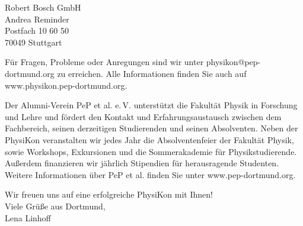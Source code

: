 \documentclass[
  pepbrief,
  fontsize=12pt,
  paper=a4,
  DIV=14,
  parskip=half,
  backaddress=false,
]{scrlttr2}
\begin{document}
\begin{letter}{%
  Robert Bosch GmbH\\
  Andrea Reminder\\
  Postfach 10 60 50\\
  70049 Stuttgart

}
Für Fragen, Probleme oder Anregungen sind wir unter physikon@pep-dortmund.org zu erreichen. Alle Informationen finden Sie auch auf www.physikon.pep-dortmund.org.

Der Alumni-Verein PeP et al. e.\,V. unterstützt die Fakultät Physik in Forschung und Lehre und fördert den Kontakt und Erfahrungsaustausch zwischen dem Fachbereich,
seinen derzeitigen Studierenden und seinen Absolventen. Neben der PhysiKon veranstalten wir jedes Jahr die Absolventenfeier der Fakultät Physik, sowie Workshops, Exkursionen
und die Sommerakademie für Physikstudierende. Außerdem finanzieren wir jährlich Stipendien für herausragende Studenten. Weitere Informationen über PeP et al. finden Sie unter
www.pep-dortmund.org.

Wir freuen uns auf eine erfolgreiche PhysiKon mit Ihnen!\\

Viele Grüße aus Dortmund,\\


Lena Linhoff

\end{letter}
\end{document}
